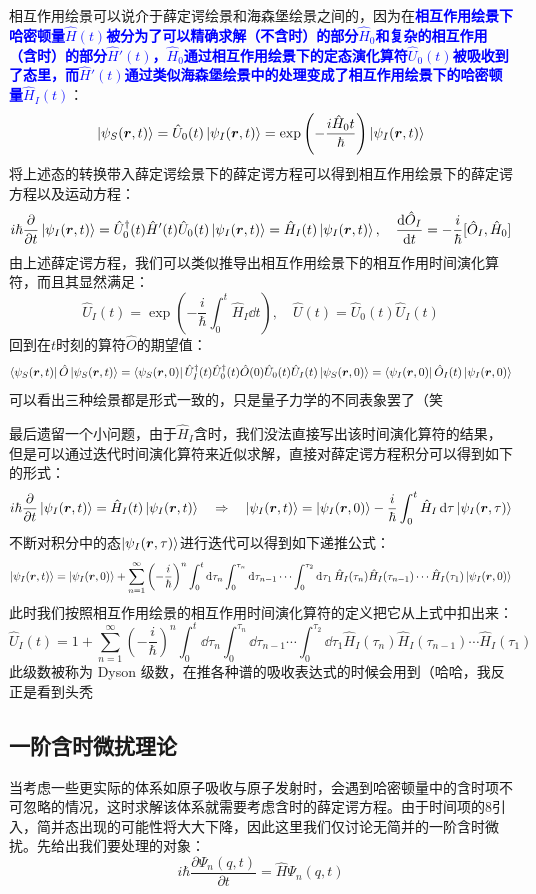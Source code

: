 相互作用绘景可以说介于薛定谔绘景和海森堡绘景之间的，因为在\textcolor{blue}{\textbf{相互作用绘景下哈密顿量$\hat{H}(t)$被分为了可以精确求解（不含时）的部分$\hat{H}_0$和复杂的相互作用（含时）的部分$\hat{H}'(t)$，$\hat{H}_0$通过相互作用绘景下的定态演化算符$\hat{U}_0(t)$被吸收到了态里，而$\hat{H}'(t)$通过类似海森堡绘景中的处理变成了相互作用绘景下的哈密顿量$\hat{H}_I(t)$}}：
\[\ket{\psi_S(\bm{r},t)}=\hat{U}_0(t)\ket{\psi_I(\bm{r},t)}=\exp\left(-\frac{i\hat{H}_0t}{\hbar}\right)\ket{\psi_I(\bm{r},t)}\]
将上述态的转换带入薛定谔绘景下的薛定谔方程可以得到相互作用绘景下的薛定谔方程以及运动方程：
\[i\hbar\pdv{t}\ket{\psi_I(\bm{r},t)}=\hat{U}^{\dagger}_0(t)\hat{H}'(t)\hat{U}_0(t)\ket{\psi_I(\bm{r},t)}=\hat{H}_I(t)\ket{\psi_I(\bm{r},t)}, \quad \dv{\hat{O}_I}{t}=-\frac{i}{\hbar}[\hat{O}_I,\hat{H}_0]\]
由上述薛定谔方程，我们可以类似推导出相互作用绘景下的相互作用时间演化算符，而且其显然满足：
\[\hat{U}_I(t)=\exp\left(-\frac{i}{\hbar}\int_{0}^{t}\hat{H}_I\dd{t}\right), \quad \hat{U}(t)=\hat{U}_0(t)\hat{U}_I(t)\]
回到在$t$时刻的算符$\hat{O}$的期望值：
\[\bra{\psi_S(\bm{r},t)}\hat{O}\ket{\psi_S(\bm{r},t)}=\bra{\psi_S(\bm{r},0)}\hat{U}_I^{\dagger}(t)\hat{U}_0^{\dagger}(t)\hat{O}(0)\hat{U}_0(t)\hat{U}_I(t)\ket{\psi_S(\bm{r},0)}=\bra{\psi_I(\bm{r},0)}\hat{O}_I(t)\ket{\psi_I(\bm{r},0)}\]
可以看出三种绘景都是形式一致的，只是量子力学的不同表象罢了（笑

最后遗留一个小问题，由于$\hat{H}_I$含时，我们没法直接写出该时间演化算符的结果，但是可以通过迭代时间演化算符来近似求解，直接对薛定谔方程积分可以得到如下的形式：
\[i\hbar\pdv{t}\ket{\psi_I(\bm{r},t)}=\hat{H}_I(t)\ket{\psi_I(\bm{r},t)} \quad \Rightarrow \quad \ket{\psi_I(\bm{r},t)}=\ket{\psi_I(\bm{r},0)}-\frac{i}{\hbar}\int_{0}^{t}\hat{H}_I\dd{\tau}\ket{\psi_I(\bm{r},\tau)}\]
不断对积分中的态$\ket{\psi_I(\bm{r},\tau)}$进行迭代可以得到如下递推公式：
\[\ket{\psi_I(\bm{r},t)}=\ket{\psi_I(\bm{r},0)}+\sum_{n=1}^{\infty}\left(-\frac{i}{\hbar}\right)^n\int_{0}^t\dd{\tau_n}\int_{0}^{\tau_n}\dd{\tau_{n-1}}\cdots\int_{0}^{\tau_2}\dd{\tau_1}\hat{H}_I(\tau_n)\hat{H}_I(\tau_{n-1})\cdots\hat{H}_I(\tau_1)\ket{\psi_I(\bm{r},0)}\]
此时我们按照相互作用绘景的相互作用时间演化算符的定义把它从上式中扣出来：
\[\hat{U}_I(t)=1+\sum_{n=1}^{\infty}\left(-\frac{i}{\hbar}\right)^n\int_{0}^t\dd{\tau_n}\int_{0}^{\tau_n}\dd{\tau_{n-1}}\cdots\int_{0}^{\tau_2}\dd{\tau_1}\hat{H}_I(\tau_n)\hat{H}_I(\tau_{n-1})\cdots\hat{H}_I(\tau_1)\]
此级数被称为 Dyson 级数，在推各种谱的吸收表达式的时候会用到（哈哈，我反正是看到头秃

\subsection{一阶含时微扰理论}
当考虑一些更实际的体系如原子吸收与原子发射时，会遇到哈密顿量中的含时项不可忽略的情况，这时求解该体系就需要考虑含时的薛定谔方程。由于时间项的8引入，简并态出现的可能性将大大下降，因此这里我们仅讨论无简并的一阶含时微扰。先给出我们要处理的对象：
\[i \hbar \frac{\partial \varPsi_n(q,t)}{\partial t}=\hat{H} \varPsi_n(q,t)\]


